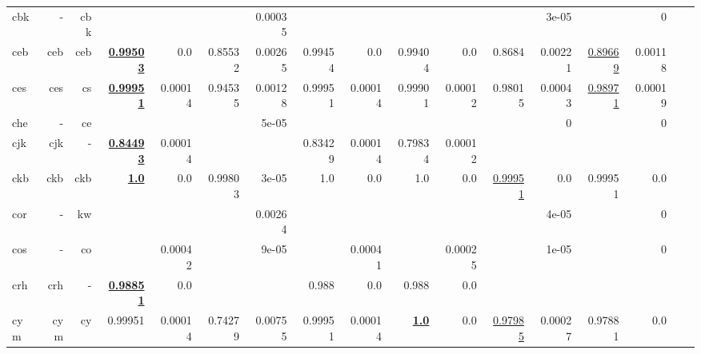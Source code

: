 \documentclass[11pt]{article}
\begin{document}
\begin{table*}[h]
{\begin{tabular}{lrrrrrrrrrrrrrrrr}
cbk         & -         & cbk         &          &          &          & 0.00035         &          &          &          &          &          & 3e-05         &          & 0         \\
ceb         & ceb         & ceb         & \textbf{\underline{0.99503}}         & 0.0         & 0.85532         & 0.00265         & 0.99454         & 0.0         & 0.99404         & 0.0         & 0.8684         & 0.00221         & \underline{0.89669}         & 0.00118         \\
ces         & ces         & cs         & \textbf{\underline{0.99951}}         & 0.00014         & 0.94535         & 0.00128         & 0.99951         & 0.00014         & 0.99901         & 0.00012         & 0.98015         & 0.00043         & \underline{0.98971}         & 0.00019         \\
che         & -         & ce         &          &          &          & 5e-05         &          &          &          &          &          & 0         &          & 0         \\
cjk         & cjk         & -         & \textbf{\underline{0.84493}}         & 0.00014         &          &          & 0.83429         & 0.00014         & 0.79834         & 0.00012         &          &          &          &          \\
ckb         & ckb         & ckb         & \textbf{\underline{1.0}}         & 0.0         & 0.99803         & 3e-05         & 1.0         & 0.0         & 1.0         & 0.0         & \underline{0.99951}         & 0.0         & 0.99951         & 0.0         \\
cor         & -         & kw         &          &          &          & 0.00264         &          &          &          &          &          & 4e-05         &          & 0         \\
cos         & -         & co         &          & 0.00042         &          & 9e-05         &          & 0.00041         &          & 0.00025         &          & 1e-05         &          & 0         \\
crh         & crh         & -         & \textbf{\underline{0.98851}}         & 0.0         &          &          & 0.988         & 0.0         & 0.988         & 0.0         &          &          &          &          \\
cym         & cym         & cy         & 0.99951         & 0.00014         & 0.74279         & 0.00755         & 0.99951         & 0.00014         & \textbf{\underline{1.0}}         & 0.0         & \underline{0.97985}         & 0.00027         & 0.97881         & 0.0         \\

\end{tabular}}
\end{table*}
\end{document}
